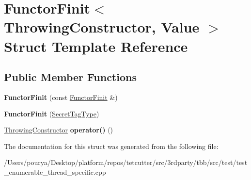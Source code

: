 \hypertarget{structFunctorFinit_3_01ThrowingConstructor_00_01Value_01_4}{}\section{Functor\+Finit$<$ Throwing\+Constructor, Value $>$ Struct Template Reference}
\label{structFunctorFinit_3_01ThrowingConstructor_00_01Value_01_4}
\subsection*{Public Member Functions}
\begin{DoxyCompactItemize}
\item 
\hypertarget{structFunctorFinit_3_01ThrowingConstructor_00_01Value_01_4_aa156d404112c5bce0069e05ad5987758}{}{\bfseries Functor\+Finit} (const \hyperlink{structFunctorFinit}{Functor\+Finit} \&)\label{structFunctorFinit_3_01ThrowingConstructor_00_01Value_01_4_aa156d404112c5bce0069e05ad5987758}

\item 
\hypertarget{structFunctorFinit_3_01ThrowingConstructor_00_01Value_01_4_a47d97f315711368a393b436915005434}{}{\bfseries Functor\+Finit} (\hyperlink{structSecretTagType}{Secret\+Tag\+Type})\label{structFunctorFinit_3_01ThrowingConstructor_00_01Value_01_4_a47d97f315711368a393b436915005434}

\item 
\hypertarget{structFunctorFinit_3_01ThrowingConstructor_00_01Value_01_4_aaab8bb39b96fdc5e5fade8d42f736a45}{}\hyperlink{classThrowingConstructor}{Throwing\+Constructor} {\bfseries operator()} ()\label{structFunctorFinit_3_01ThrowingConstructor_00_01Value_01_4_aaab8bb39b96fdc5e5fade8d42f736a45}

\end{DoxyCompactItemize}


The documentation for this struct was generated from the following file\+:\begin{DoxyCompactItemize}
\item 
/\+Users/pourya/\+Desktop/platform/repos/tetcutter/src/3rdparty/tbb/src/test/test\+\_\+enumerable\+\_\+thread\+\_\+specific.\+cpp\end{DoxyCompactItemize}
